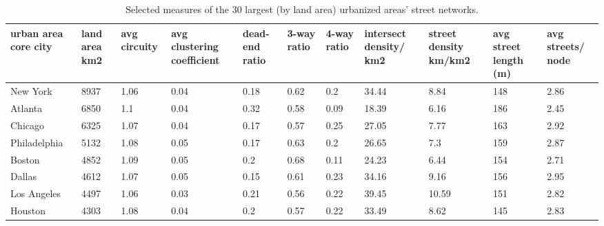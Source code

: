 \documentclass{article}
\begin{document}
\begin{landscape}
\begin{table}
\centering
\caption{Selected measures of the 30 largest (by land area) urbanized areas' street networks.}
\label{table02}
\begin{tabular}{p{2.5cm} p{1.5cm} p{1.5cm} p{1.5cm} p{1.55cm} p{1.5cm} p{1.5cm} p{1.5cm} p{1.5cm} p{1.5cm} p{1.5cm}}
\hline
urban area core city & land area km2 & avg circuity & avg clustering coefficient & dead-end ratio & 3-way ratio & 4-way ratio & intersect density/ km2 & street density km/km2 & avg street length (m) & avg streets/ node \\
\hline
New York             & 8937          & 1.06         & 0.04                       & 0.18           & 0.62        & 0.2         & 34.44                 & 8.84                  & 148                   & 2.86             \\
Atlanta              & 6850          & 1.1          & 0.04                       & 0.32           & 0.58        & 0.09        & 18.39                 & 6.16                  & 186                   & 2.45             \\
Chicago              & 6325          & 1.07         & 0.04                       & 0.17           & 0.57        & 0.25        & 27.05                 & 7.77                  & 163                   & 2.92             \\
Philadelphia         & 5132          & 1.08         & 0.05                       & 0.17           & 0.63        & 0.2         & 26.65                 & 7.3                   & 159                   & 2.87             \\
Boston               & 4852          & 1.09         & 0.05                       & 0.2            & 0.68        & 0.11        & 24.23                 & 6.44                  & 154                   & 2.71             \\
Dallas               & 4612          & 1.07         & 0.05                       & 0.15           & 0.61        & 0.23        & 34.16                 & 9.16                  & 156                   & 2.95             \\
Los Angeles          & 4497          & 1.06         & 0.03                       & 0.21           & 0.56        & 0.22        & 39.45                 & 10.59                 & 151                   & 2.82             \\
Houston              & 4303          & 1.08         & 0.04                       & 0.2            & 0.57        & 0.22        & 33.49                 & 8.62                  & 145                   & 2.83             \\

\end{tabular}
\end{table}
\end{landscape}
\end{document}
